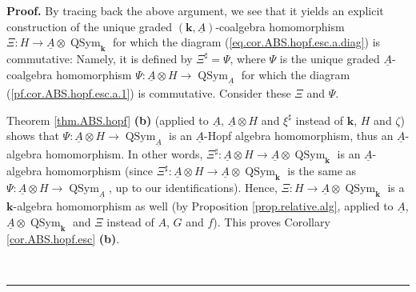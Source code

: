 \documentclass[numbers=enddot,12pt,final,onecolumn,notitlepage,abstracton]{scrartcl}%
\theoremstyle{definition}
\newenvironment{proof}[1][Proof]{\noindent\textbf{#1.} }{\ \rule{0.5em}{0.5em}}
\begin{document}
\begin{proof}
By tracing back the above argument, we see that it yields an explicit
construction of the unique graded $\left(  \mathbf{k},\underline{A}\right)
$-coalgebra homomorphism $\Xi:H\rightarrow\underline{A}\otimes
\operatorname*{QSym}\nolimits_{\mathbf{k}}$ for which the diagram
(\ref{eq.cor.ABS.hopf.esc.a.diag}) is commutative: Namely, it is defined by
$\Xi^{\sharp}=\Psi$, where $\Psi$ is the unique graded $\underline{A}%
$-coalgebra homomorphism $\Psi:\underline{A}\otimes H\rightarrow
\operatorname*{QSym}\nolimits_{\underline{A}}$ for which the diagram
(\ref{pf.cor.ABS.hopf.esc.a.1}) is commutative. Consider these $\Xi$ and
$\Psi$.

Theorem \ref{thm.ABS.hopf} \textbf{(b)} (applied to $\underline{A}$,
$\underline{A}\otimes H$ and $\xi^{\sharp}$ instead of $\mathbf{k}$, $H$ and
$\zeta$) shows that $\Psi:\underline{A}\otimes H\rightarrow
\operatorname*{QSym}\nolimits_{\underline{A}}$ is an $\underline{A}$-Hopf
algebra homomorphism, thus an $\underline{A}$-algebra homomorphism. In other
words, $\Xi^{\sharp}:\underline{A}\otimes H\rightarrow\underline{A}%
\otimes\operatorname*{QSym}\nolimits_{\mathbf{k}}$ is an $\underline{A}%
$-algebra homomorphism (since $\Xi^{\sharp}:\underline{A}\otimes
H\rightarrow\underline{A}\otimes\operatorname*{QSym}\nolimits_{\mathbf{k}}$ is
the same as $\Psi:\underline{A}\otimes H\rightarrow\operatorname*{QSym}%
\nolimits_{\underline{A}}$, up to our identifications). Hence, $\Xi
:H\rightarrow\underline{A}\otimes\operatorname*{QSym}\nolimits_{\mathbf{k}}$
is a $\mathbf{k}$-algebra homomorphism as well (by Proposition
\ref{prop.relative.alg}, applied to $\underline{A}$, $\underline{A}%
\otimes\operatorname*{QSym}\nolimits_{\mathbf{k}}$ and $\Xi$ instead of $A$,
$G$ and $f$). This proves Corollary \ref{cor.ABS.hopf.esc} \textbf{(b)}.


\end{proof}
\end{document}
